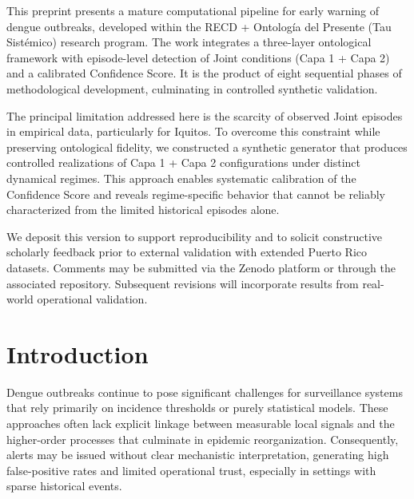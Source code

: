 \documentclass[11pt,a4paper]{article}
\begin{document}
\begin{zenodolletter}
This preprint presents a mature computational pipeline for early warning of dengue outbreaks, developed within the RECD + Ontología del Presente (Tau Sistémico) research program. The work integrates a three-layer ontological framework with episode-level detection of Joint conditions (Capa 1 + Capa 2) and a calibrated Confidence Score. It is the product of eight sequential phases of methodological development, culminating in controlled synthetic validation.

The principal limitation addressed here is the scarcity of observed Joint episodes in empirical data, particularly for Iquitos. To overcome this constraint while preserving ontological fidelity, we constructed a synthetic generator that produces controlled realizations of Capa 1 + Capa 2 configurations under distinct dynamical regimes. This approach enables systematic calibration of the Confidence Score and reveals regime-specific behavior that cannot be reliably characterized from the limited historical episodes alone.

We deposit this version to support reproducibility and to solicit constructive scholarly feedback prior to external validation with extended Puerto Rico datasets. Comments may be submitted via the Zenodo platform or through the associated repository. Subsequent revisions will incorporate results from real-world operational validation.
\end{zenodolletter}

\vspace{0.5em}

\section{Introduction}

Dengue outbreaks continue to pose significant challenges for surveillance systems that rely primarily on incidence thresholds or purely statistical models. These approaches often lack explicit linkage between measurable local signals and the higher-order processes that culminate in epidemic reorganization. Consequently, alerts may be issued without clear mechanistic interpretation, generating high false-positive rates and limited operational trust, especially in settings with sparse historical events.
\end{document}
